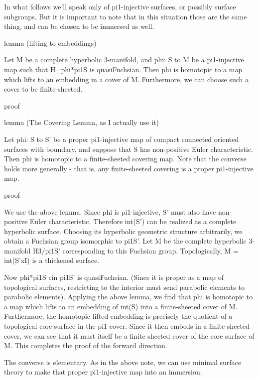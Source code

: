 In what follows we'll speak only of pi1-injective surfaces, or possibly surface
subgroups. But it is important to note that in this situation those are the
same thing, and can be chosen to be immersed as well.

lemma (lifting to embeddings)

Let M be a complete hyperbolic 3-manifold, and phi: S to M be a pi1-injective
map such that H=phi*pi1S is quasiFuchsian. Then phi is homotopic to a map which
lifts to an embedding in a cover of M. Furthermore, we can choose such a cover
to be finite-sheeted.

proof



lemma (The Covering Lemma, as I actually use it)

Let phi: S to S' be a proper pi1-injective map of compact connected oriented
surfaces with boundary, and suppose that S has non-positive Euler
characteristic. Then phi is homotopic to a finite-sheeted covering map.  Note
that the converse holds more generally - that is, any finite-sheeted covering
is a proper pi1-injective map.

proof

We use the above lemma. Since phi is pi1-injective, S' must also have
non-positive Euler characteristic. Therefore int(S') can be realized as
a complete hyperbolic surface. Choosing its hyperbolic geometric structure
arbitrarily, we obtain a Fuchsian group isomorphic to pi1S'. Let M be the
complete hyperbolic 3-manifold H3/pi1S' corresponding to this Fuchsian group.
Topologically, M = int(S'xI) is a thickened surface.

Now phi*pi1S cin pi1S' is quasiFuchsian. (Since it is proper as a map of
topological surfaces, restricting to the interior must send parabolic elements
to parabolic elements). Applying the above lemma, we find that phi is homotopic
to a map which lifts to an embedding of int(S) into a finite-sheeted cover of
M. Furthermore, the homotopic lifted embedding is precisely the quotient of
a topological core surface in the pi1 cover. Since it then embeds in
a finite-sheeted cover, we can see that it must itself be a finite sheeted
cover of the core surface of M. This completes the proof of the forward
direction.

The converse is elementary. As in the above note, we can use minimal surface
theory to make that proper pi1-injective map into an immersion.

